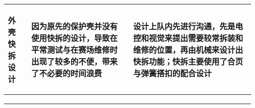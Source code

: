 \begin{longtable}{ p{2cm} | p{7.8cm} | p{6cm} |}
    \hline
    
        \begin{center}
            外壳快拆设计 
        \end{center} \cellcolor{gndcolor} &
        \begin{center}
            因为原先的保护壳并没有使用快拆的设计，导致在平常测试与在赛场维修时出现了较多的不便，带来了不必要的时间浪费
        \end{center} \cellcolor{gndcolor} &
        \begin{center}
            设计上队内先进行沟通，先是电控和视觉来提出需要较常拆装和维修的位置，再由机械来设计出快拆功能；快拆主要使用了合页与弹簧搭扣的配合设计
        \end{center} \cellcolor{gndcolor} \\

    \hline
    
        \begin{center}
            
        \end{center} &
        \begin{center}
            
        \end{center} &
        \begin{center}
            
        \end{center} \\
        
    \hline
    
        \begin{center}
            
        \end{center} &
        \begin{center}
            
        \end{center} &
        \begin{center}
            
        \end{center} \\

    \hline
    
        \begin{center}
            
        \end{center} &
        \begin{center}
            

\end{center}
\end{longtable}

